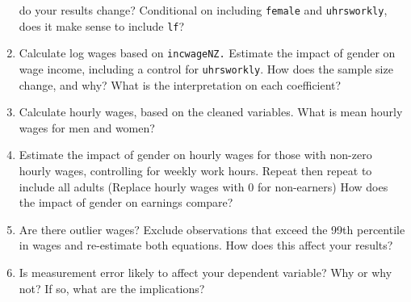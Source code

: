 \documentclass[11pt]{article}
\begin{document}
\begin{enumerate}
  do your results change? Conditional on including \texttt{female} and
  \texttt{uhrsworkly}, does it make sense to include \texttt{lf}?
\item
  Calculate log wages based on \texttt{incwageNZ.} Estimate the impact
  of gender on wage income, including a control for \texttt{uhrsworkly}.
  How does the sample size change, and why? What is the interpretation
  on each coefficient?
\item
  Calculate hourly wages, based on the cleaned variables. What is mean
  hourly wages for men and women?
\item
  Estimate the impact of gender on hourly wages for those with non-zero
  hourly wages, controlling for weekly work hours. Repeat then repeat to
  include all adults (Replace hourly wages with 0 for non-earners) How
  does the impact of gender on earnings compare?
\item
  Are there outlier wages? Exclude observations that exceed the 99th
  percentile in wages and re-estimate both equations. How does this
  affect your results?
\item
  Is measurement error likely to affect your dependent variable? Why or
  why not? If so, what are the implications?
\end{enumerate}
\end{document}
